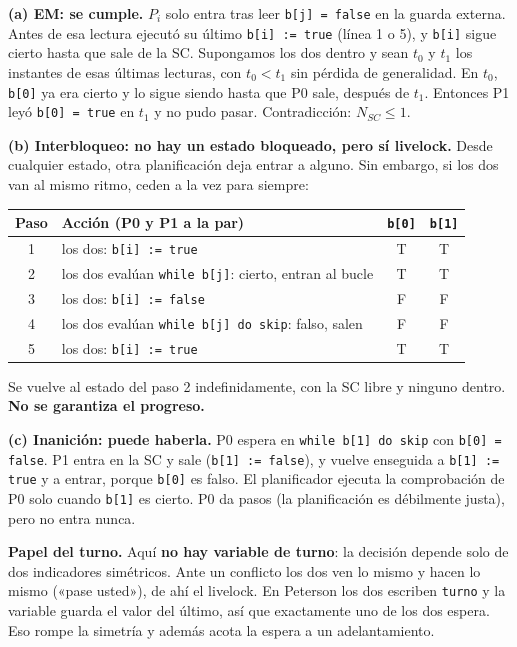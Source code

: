 \begin{solucion}
\textbf{(a) EM: se cumple.} $P_i$ solo entra tras leer \texttt{b[j] = false} en la guarda externa. Antes de esa
lectura ejecutó su último \texttt{b[i] := true} (línea 1 o 5), y \texttt{b[i]} sigue cierto hasta que sale de la
SC. Supongamos los dos dentro y sean $t_0$ y $t_1$ los instantes de esas últimas lecturas, con $t_0 < t_1$ sin
pérdida de generalidad. En $t_0$, \texttt{b[0]} ya era cierto y lo sigue siendo hasta que P0 sale, después de
$t_1$. Entonces P1 leyó \texttt{b[0] = true} en $t_1$ y no pudo pasar. Contradicción: $N_{SC} \le 1$.

\textbf{(b) Interbloqueo: no hay un estado bloqueado, pero sí livelock.} Desde cualquier estado, otra
planificación deja entrar a alguno. Sin embargo, si los dos van al mismo ritmo, ceden a la vez para siempre:
\begin{center}\small
\begin{tabular}{clcc}
\toprule
\textbf{Paso} & \textbf{Acción (P0 y P1 a la par)} & \texttt{b[0]} & \texttt{b[1]} \\ \midrule
1 & los dos: \texttt{b[i] := true} & T & T \\
2 & los dos evalúan \texttt{while b[j]}: cierto, entran al bucle & T & T \\
3 & los dos: \texttt{b[i] := false} & F & F \\
4 & los dos evalúan \texttt{while b[j] do skip}: falso, salen & F & F \\
5 & los dos: \texttt{b[i] := true} & T & T \\
\bottomrule
\end{tabular}
\end{center}
Se vuelve al estado del paso 2 indefinidamente, con la SC libre y ninguno dentro. \textbf{No se garantiza el
progreso.}

\textbf{(c) Inanición: puede haberla.} P0 espera en \texttt{while b[1] do skip} con \texttt{b[0] = false}. P1 entra
en la SC y sale (\texttt{b[1] := false}), y vuelve enseguida a \texttt{b[1] := true} y a entrar, porque
\texttt{b[0]} es falso. El planificador ejecuta la comprobación de P0 solo cuando \texttt{b[1]} es cierto. P0 da
pasos (la planificación es débilmente justa), pero no entra nunca.

\textbf{Papel del turno.} Aquí \textbf{no hay variable de turno}: la decisión depende solo de dos indicadores
simétricos. Ante un conflicto los dos ven lo mismo y hacen lo mismo («pase usted»), de ahí el livelock. En
Peterson los dos escriben \texttt{turno} y la variable guarda el valor del último, así que exactamente uno de los
dos espera. Eso rompe la simetría y además acota la espera a un adelantamiento.
\end{solucion}

